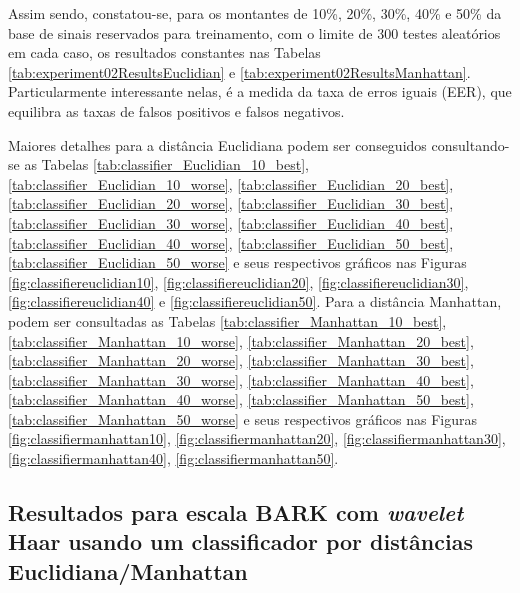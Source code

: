 		\par Assim sendo, constatou-se, para os montantes de 10\%, 20\%, 30\%, 40\% e 50\% da base de sinais reservados para treinamento, com o limite de 300 testes aleatórios em cada caso, os resultados constantes nas Tabelas \ref{tab:experiment02ResultsEuclidian} e \ref{tab:experiment02ResultsManhattan}. Particularmente interessante nelas, é a medida da taxa de erros iguais (EER), que equilibra as taxas de falsos positivos e falsos negativos. 
		
		\par Maiores detalhes para a distância Euclidiana podem ser conseguidos consultando-se as Tabelas \ref{tab:classifier_Euclidian_10_best}, \ref{tab:classifier_Euclidian_10_worse},
		\ref{tab:classifier_Euclidian_20_best}, \ref{tab:classifier_Euclidian_20_worse}, 
		\ref{tab:classifier_Euclidian_30_best}, \ref{tab:classifier_Euclidian_30_worse}, 
		\ref{tab:classifier_Euclidian_40_best}, \ref{tab:classifier_Euclidian_40_worse}, 
		\ref{tab:classifier_Euclidian_50_best}, \ref{tab:classifier_Euclidian_50_worse}
		e seus respectivos gráficos nas Figuras \ref{fig:classifiereuclidian10}, \ref{fig:classifiereuclidian20}, \ref{fig:classifiereuclidian30}, \ref{fig:classifiereuclidian40} e \ref{fig:classifiereuclidian50}. Para a distância Manhattan, podem ser consultadas as Tabelas 	\ref{tab:classifier_Manhattan_10_best}, \ref{tab:classifier_Manhattan_10_worse}, 
		\ref{tab:classifier_Manhattan_20_best}, \ref{tab:classifier_Manhattan_20_worse}, 
		\ref{tab:classifier_Manhattan_30_best}, \ref{tab:classifier_Manhattan_30_worse}, 
		\ref{tab:classifier_Manhattan_40_best}, \ref{tab:classifier_Manhattan_40_worse}, 
		\ref{tab:classifier_Manhattan_50_best}, \ref{tab:classifier_Manhattan_50_worse} 
		e seus respectivos gráficos nas Figuras		 
		\ref{fig:classifiermanhattan10}, \ref{fig:classifiermanhattan20}, 	 \ref{fig:classifiermanhattan30}, \ref{fig:classifiermanhattan40},  \ref{fig:classifiermanhattan50}.
		
		
		
		\subsection{Resultados para escala BARK com \textit{wavelet} Haar usando um classificador por distâncias Euclidiana/Manhattan}

			
			
			
			
			
			
			
			
			
			

